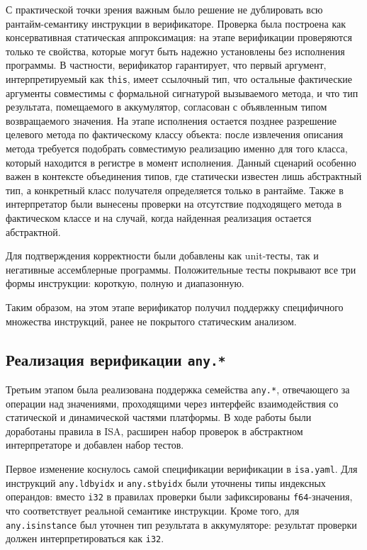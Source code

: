 С практической точки зрения важным было решение не дублировать всю рантайм-семантику инструкции в
верификаторе. Проверка была построена как консервативная статическая аппроксимация: на этапе
верификации проверяются только те свойства, которые могут быть надежно установлены без исполнения
программы. В частности, верификатор гарантирует, что первый аргумент, интерпретируемый как
\texttt{this}, имеет ссылочный тип, что остальные фактические аргументы совместимы с формальной
сигнатурой вызываемого метода, и что тип результата, помещаемого в аккумулятор, согласован с
объявленным типом возвращаемого значения. На этапе исполнения остается позднее разрешение целевого 
метода по фактическому классу объекта: после извлечения
описания метода требуется подобрать совместимую реализацию именно для того класса,
который находится в регистре в момент исполнения. Данный сценарий особенно важен в контексте объединения типов,
где статически известен лишь абстрактный тип, а конкретный класс получателя
определяется только в рантайме. Также в интерпретатор были вынесены проверки на отсутствие подходящего 
метода в фактическом классе и на случай, когда найденная реализация остается абстрактной.

Для подтверждения корректности были добавлены как unit-тесты, так и негативные ассемблерные программы.
Положительные тесты покрывают все три формы инструкции: короткую, полную и диапазонную.

Таким образом, на этом этапе верификатор получил поддержку специфичного
множества инструкций, ранее не покрытого статическим анализом.

\subsection{Реализация верификации \texttt{any.*}}

Третьим этапом была реализована поддержка семейства \texttt{any.*}, отвечающего за операции над
значениями, проходящими через интерфейс взаимодействия со статической и динамической частями
платформы. В ходе работы были доработаны правила в ISA,
расширен набор проверок в абстрактном интерпретаторе и добавлен набор тестов.

Первое изменение коснулось самой спецификации верификации в \newline \texttt{isa.yaml}. Для инструкций
\texttt{any.ldbyidx} и \texttt{any.stbyidx} были уточнены типы индексных операндов: вместо
\texttt{i32} в правилах проверки были зафиксированы \texttt{f64}-значения, что соответствует
реальной семантике инструкции. Кроме того, для \texttt{any.isinstance} был уточнен тип результата в
аккумуляторе: результат проверки должен интерпретироваться как \texttt{i32}.

